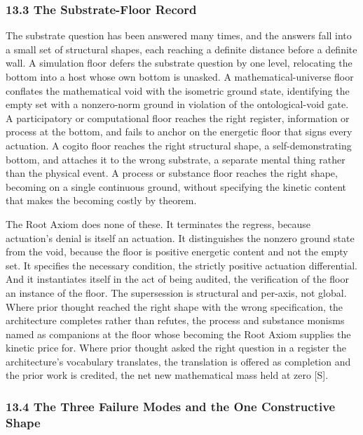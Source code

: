 \documentclass[10pt,twocolumn]{article}
\begin{document}
\hypertarget{the-substrate-floor-record}{%
\subsubsection{13.3 The Substrate-Floor
Record}\label{the-substrate-floor-record}}

The substrate question has been answered many times, and the answers
fall into a small set of structural shapes, each reaching a definite
distance before a definite wall. A simulation floor defers the substrate
question by one level, relocating the bottom into a host whose own
bottom is unasked. A mathematical-universe floor conflates the
mathematical void with the isometric ground state, identifying the empty
set with a nonzero-norm ground in violation of the ontological-void
gate. A participatory or computational floor reaches the right register,
information or process at the bottom, and fails to anchor on the
energetic floor that signs every actuation. A cogito floor reaches the
right structural shape, a self-demonstrating bottom, and attaches it to
the wrong substrate, a separate mental thing rather than the physical
event. A process or substance floor reaches the right shape, becoming on
a single continuous ground, without specifying the kinetic content that
makes the becoming costly by theorem.

The Root Axiom does none of these. It terminates the regress, because
actuation's denial is itself an actuation. It distinguishes the nonzero
ground state from the void, because the floor is positive energetic
content and not the empty set. It specifies the necessary condition, the
strictly positive actuation differential. And it instantiates itself in
the act of being audited, the verification of the floor an instance of
the floor. The supersession is structural and per-axis, not global.
Where prior thought reached the right shape with the wrong
specification, the architecture completes rather than refutes, the
process and substance monisms named as companions at the floor whose
becoming the Root Axiom supplies the kinetic price for. Where prior
thought asked the right question in a register the architecture's
vocabulary translates, the translation is offered as completion and the
prior work is credited, the net new mathematical mass held at zero
{[}S{]}.

\hypertarget{the-three-failure-modes-and-the-one-constructive-shape}{%
\subsubsection{13.4 The Three Failure Modes and the One Constructive
Shape}\label{the-three-failure-modes-and-the-one-constructive-shape}}
\end{document}
